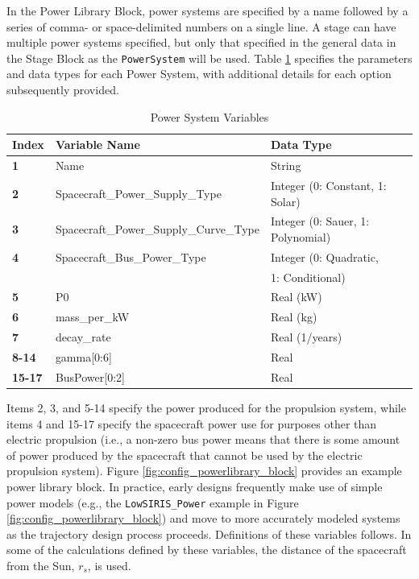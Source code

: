 In the Power Library Block, power systems are specified by a name followed by a series of comma- or space-delimited numbers on a single line. A stage can have multiple power systems specified, but only that specified in the general data in the Stage Block as the {\tt PowerSystem} will be used. Table \ref{tab:spacecraft_stage_powerlib_block} specifies the parameters and data types for each Power System, with additional details for each option subsequently provided.

\begin{table}[ht]
    \centering
    \begin{tabular}{lll}
    \hline
    \textbf{Index} & \textbf{Variable Name} & \textbf{Data Type} \\
    \hline
    \textbf{1} & Name & String \\
    \textbf{2} & Spacecraft\_Power\_Supply\_Type & Integer (0: Constant, 1: Solar) \\
    \textbf{3} & Spacecraft\_Power\_Supply\_Curve\_Type & Integer (0: Sauer, 1: Polynomial) \\
    \textbf{4} & Spacecraft\_Bus\_Power\_Type & Integer (0: Quadratic, \\ & & \hspace{3em}\hspace{5pt} 1: Conditional) \\
    \textbf{5} & P0 & Real (kW) \\
    \textbf{6} & mass\_per\_kW & Real (kg) \\
    \textbf{7} & decay\_rate & Real (1/years) \\
    \textbf{8-14} & gamma[0:6] & Real \\
    \textbf{15-17} & BusPower[0:2] & Real \\
    \end{tabular}
    \caption{Power System Variables}
    \label{tab:spacecraft_stage_powerlib_block}
\end{table}


Items 2, 3, and 5-14 specify the power produced for the propulsion system, while items 4 and 15-17 specify the spacecraft power use for purposes other than electric propulsion (i.e., a non-zero bus power means that there is some amount of power produced by the spacecraft that cannot be used by the electric propulsion system). Figure \ref{fig:config_powerlibrary_block} provides an example power library block. In practice, early designs frequently make use of simple power models (e.g., the {\tt LowSIRIS\_Power} example in Figure \ref{fig:config_powerlibrary_block}) and move to more accurately modeled systems as the trajectory design process proceeds. Definitions of these variables follows. In some of the calculations defined by these variables, the distance of the spacecraft from the Sun, $r_s$, is used.


